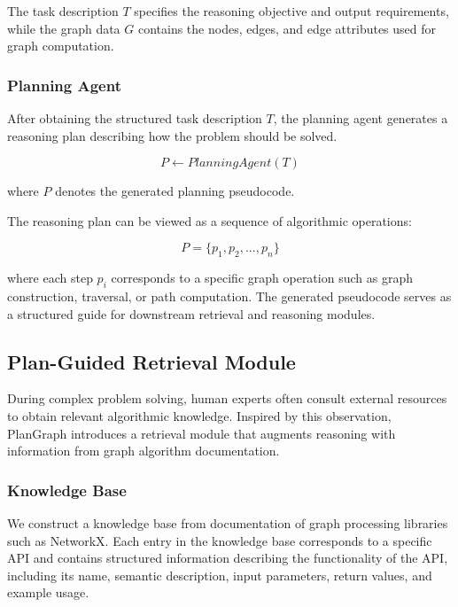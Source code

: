 \documentclass[sigconf,review,anonymous]{acmart}
\begin{document}
The task description $T$ specifies the reasoning objective
and output requirements, while the graph data $G$ contains
the nodes, edges, and edge attributes used for graph
computation.

\subsubsection{Planning Agent}

After obtaining the structured task description $T$, the
planning agent generates a reasoning plan describing how
the problem should be solved.

\begin{equation}
P \leftarrow PlanningAgent(T)
\end{equation}

where $P$ denotes the generated planning pseudocode.

The reasoning plan can be viewed as a sequence of algorithmic
operations:

\begin{equation}
P = \{p_1, p_2, ..., p_n\}
\end{equation}

where each step $p_i$ corresponds to a specific graph
operation such as graph construction, traversal, or path
computation. The generated pseudocode serves as a structured
guide for downstream retrieval and reasoning modules.

\subsection{Plan-Guided Retrieval Module}

During complex problem solving, human experts often consult
external resources to obtain relevant algorithmic knowledge.
Inspired by this observation, PlanGraph introduces a retrieval
module that augments reasoning with information from graph
algorithm documentation.

\subsubsection{Knowledge Base}

We construct a knowledge base from documentation of graph
processing libraries such as NetworkX. Each entry in the
knowledge base corresponds to a specific API and contains
structured information describing the functionality of the
API, including its name, semantic description, input
parameters, return values, and example usage.
\end{document}
